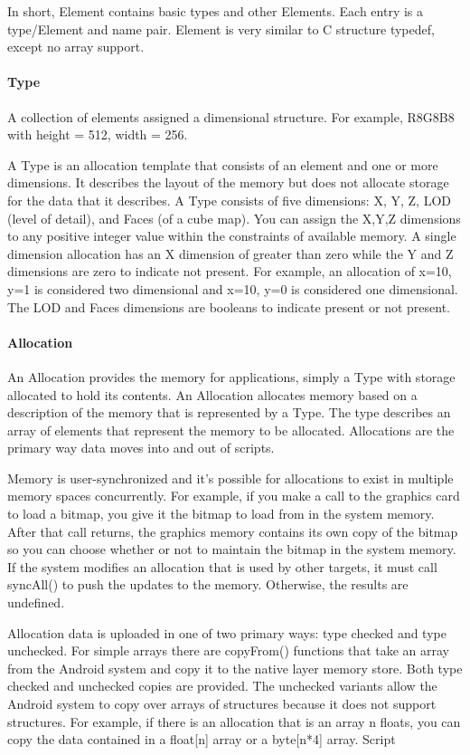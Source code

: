 In short, Element contains basic types and other Elements. Each entry is a type/Element and name pair. Element is very similar to C structure typedef, except no array support.

\paragraph{Type}
A collection of elements assigned a dimensional structure. For example,  R8G8B8 with height = 512, width = 256.

A Type is an allocation template that consists of an element and one or more dimensions. It describes the layout of the memory but does not allocate storage for the data that it describes. 
A Type consists of five dimensions: X, Y, Z, LOD (level of detail), and Faces (of a cube map). You can assign the X,Y,Z dimensions to any positive integer value within the constraints of available memory. A single dimension allocation has an X dimension of greater than zero while the Y and Z dimensions are zero to indicate not present. For example, an allocation of x=10, y=1 is considered two dimensional and x=10, y=0 is considered one dimensional. The LOD and Faces dimensions are booleans to indicate present or not present.

\paragraph{Allocation}
An Allocation provides the memory for applications, simply a Type with storage allocated to hold its contents. An Allocation allocates memory based on a description of the memory that is represented by a Type. The type describes an array of elements that represent the memory to be allocated. Allocations are the primary way data moves into and out of scripts.

Memory is user-synchronized and it's possible for allocations to exist in multiple memory spaces concurrently. For example, if you make a call to the graphics card to load a bitmap, you give it the bitmap to load from in the system memory. After that call returns, the graphics memory contains its own copy of the bitmap so you can choose whether or not to maintain the bitmap in the system memory. If the \RS{} system modifies an allocation that is used by other targets, it must call syncAll() to push the updates to the memory. Otherwise, the results are undefined.

Allocation data is uploaded in one of two primary ways: type checked and type unchecked. For simple arrays there are copyFrom() functions that take an array from the Android system and copy it to the native layer memory store. Both type checked and unchecked copies are provided. The unchecked variants allow the Android system to copy over arrays of structures because it does not support structures. For example, if there is an allocation that is an array n floats, you can copy the data contained in a float[n] array or a byte[n*4] array.
Script	


